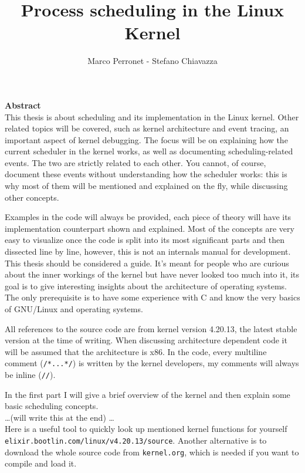 \documentclass[10pt]{book}
\author{Marco Perronet - Stefano Chiavazza}
\title{Process scheduling in the Linux Kernel}
\begin{document}
\maketitle
\tableofcontents
\textbf{Abstract}\\
This thesis is about scheduling and its implementation in the Linux kernel. Other related topics
will be covered, such as kernel architecture and event tracing, an important aspect of kernel debugging. %
The focus will be on explaining how the current scheduler in the kernel works, as well as documenting scheduling-related events.
The two are strictly related to each other. You cannot, of course, document these events without understanding how the scheduler works: this is 
why most of them will be mentioned and explained on the fly, while discussing other concepts.

Examples in the code will always be provided, each piece of theory will have its implementation counterpart shown and explained.
Most of the concepts are very easy to visualize once the code is split into its most significant parts
and then dissected line by line, however, this is not an internals manual for development. 
This thesis should be considered a guide. It's meant for people who are curious about the inner workings of the kernel
but have never looked too much into it, its goal is to give interesting insights about the architecture of operating systems.
The only prerequisite is to have some experience with C and know the very basics of GNU/Linux and operating systems.

All references to the source code are from kernel version 4.20.13, the latest stable version at the time of writing. When discussing architecture dependent code it will be assumed that the architecture is x86. In the code, every multiline comment (\verb|/*...*/|) is written by the kernel developers, my comments will always be inline (\verb|//|).

In the first part I will give a brief overview of the kernel and then explain some basic scheduling concepts.\\
\dots (will write this at the end)
\dots\\
Here is a useful tool to quickly look up mentioned kernel functions for yourself \texttt{elixir.bootlin.com/linux/v4.20.13/source}. Another alternative is to download the whole source code from \texttt{kernel.org}, which is needed if you want to compile and load it. 
\end{document}
